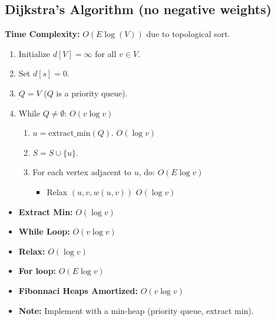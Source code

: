 \subsection{Dijkstra's Algorithm (no negative weights)}
\begin{definition}
    \textbf{Time Complexity:} \( O(E \log(V)) \) due to topological sort. 

    \begin{enumerate}
        \item Initialize \( d[V] = \infty \) for all \( v \in V \).
        \item Set \( d[s] = 0 \).
        \item \( Q = V \) \quad (\( Q \) is a priority queue).
        \item While \( Q \neq \emptyset \): $O(v \log v)$
        \begin{enumerate}
            \item \( u = \text{extract\_min}(Q) \). $O( \log v)$
            \item \( S = S \cup \{ u \} \).
            \item For each vertex adjacent to \( u \), do: $O(E \log v)$
            \begin{itemize}
                \item Relax \( (u, v, w(u, v)) \) $O(\log v)$
            \end{itemize}
        \end{enumerate}
    \end{enumerate}
    \begin{itemize}
        \item \textbf{Extract Min:} $O(\log v)$
        \item \textbf{While Loop:} $O(v \log v)$
        \item \textbf{Relax:} $O(\log v)$
        \item \textbf{For loop:} $O(E \log v)$
        \item \textbf{Fibonnaci Heaps Amortized:} $O(v \log v)$
        \item \textbf{Note:} Implement with a min-heap (priority queue, extract min).
    \end{itemize}
\end{definition}


